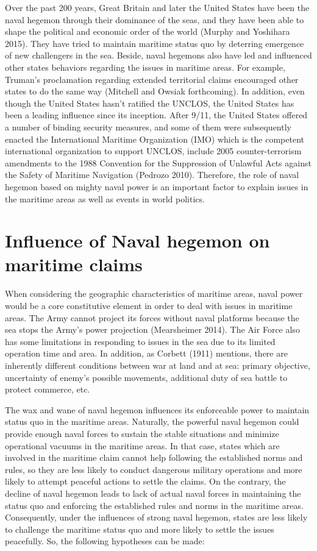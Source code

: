 \documentclass{article}
\begin{document}
Over the past 200 years, Great Britain and later the United States have been the naval hegemon through their dominance of the seas, and they have been able to shape the political and economic order of the world (Murphy and Yoshihara 2015). They have tried to maintain maritime status quo by deterring emergence of new challengers in the sea. Beside, naval hegemons also have led and influenced other states behaviors regarding the issues in maritime areas. For example, Truman’s proclamation regarding extended territorial claims encouraged other states to do the same way (Mitchell and Owsiak forthcoming). In addition, even though the United States hasn’t ratified the UNCLOS, the United States has been a leading influence since its inception. After 9/11, the United States offered a number of binding security measures, and some of them were subsequently enacted the International Maritime Organization (IMO) which is the competent international organization to support UNCLOS, include 2005 counter-terrorism amendments to the 1988 Convention for the Suppression of Unlawful Acts against the Safety of Maritime Navigation (Pedrozo 2010). Therefore, the role of naval hegemon based on mighty naval power is an important factor to explain issues in the maritime areas as well as events in world politics.

\section*{Influence of Naval hegemon on maritime claims}
\hspace{0.5cm}When considering the geographic characteristics of maritime areas, naval power would be a core constitutive element in order to deal with issues in maritime areas. The Army cannot project its forces without naval platforms because the sea stops the Army’s power projection (Mearsheimer 2014). The Air Force also has some limitations in responding to issues in the sea due to its limited operation time and area. In addition, as Corbett (1911) mentions, there are inherently different conditions between war at land and at sea: primary objective, uncertainty of enemy’s possible movements, additional duty of sea battle to protect commerce, etc. 

The wax and wane of naval hegemon influences its enforceable power to maintain status quo in the maritime areas. Naturally, the powerful naval hegemon could provide enough naval forces to sustain the stable situations and minimize operational vacuums in the maritime areas. In that case, states which are involved in the maritime claim cannot help following the established norms and rules, so they are less likely to conduct dangerous military operations and more likely to attempt peaceful actions to settle the claims. On the contrary, the decline of naval hegemon leads to lack of actual naval forces in maintaining the status quo and enforcing the established rules and norms in the maritime areas. Consequently, under the influences of strong naval hegemon, states are less likely to challenge the maritime status quo and more likely to settle the issues peacefully. So, the following hypotheses can be made: 
\\
\end{document}
